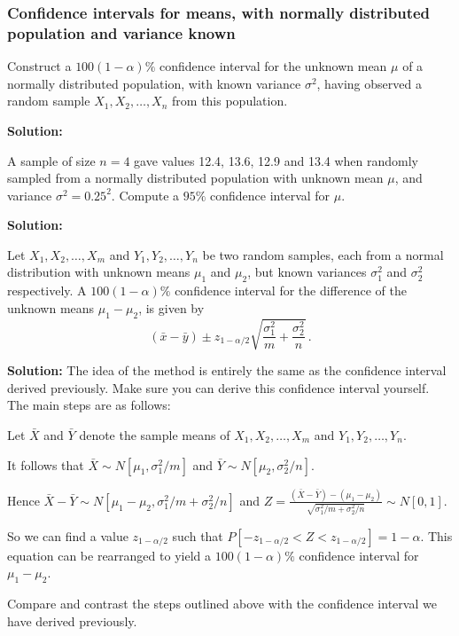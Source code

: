 \documentclass[12pt]{article}
\newenvironment{example}[1][Example:]{\begin{trivlist}
\item[\hskip \labelsep {\bfseries #1}]}{\end{trivlist}}
\begin{document}
\subsubsection{Confidence intervals for means, with normally distributed population and variance known}
\begin{example}
Construct a $100(1-\alpha)\%$ confidence interval for the unknown mean $\mu$ of a normally distributed population, with known variance $\sigma^{2}$, having observed a random sample $X_{1},X_{2},\ldots, X_{n}$ from this population.
\end{example}
\begin{mdframed}
{\bf Solution:}
\textcolor[rgb]{1.00,1.00,1.00}{\lipsum[1-8]}
\end{mdframed}

\begin{example}
A sample of size $n=4$ gave values 12.4, 13.6, 12.9 and 13.4 when randomly sampled from a normally distributed population with unknown mean $\mu$, and variance $\sigma^{2}=0.25^2.$ Compute a $95\%$ confidence interval for $\mu.$
\end{example}

\begin{mdframed}
{\bf Solution:}
\textcolor[rgb]{1.00,1.00,1.00}{\lipsum[1-3]}
\end{mdframed}



\begin{example}
Let $X_{1},X_{2},\ldots, X_{m}$ and $Y_{1},Y_{2},\ldots,Y_{n}$ be two random samples, each from a normal distribution with unknown means $\mu_{1}$ and $\mu_{2}$, but known variances $\sigma_{1}^{2}$ and $\sigma_{2}^{2}$ respectively. A $100(1-\alpha)\%$ confidence interval for the difference of the unknown means $\mu_{1}-\mu_{2}$, is given by $$(\bar{x}-\bar{y})\pm z_{1-\alpha/2}\sqrt{\frac{\sigma_{1}^{2}}{m}+\frac{\sigma_{2}^{2}}{n}}\, .$$
\end{example}
\begin{mdframed}
{\bf Solution:}
The idea of the method is entirely the same as the confidence interval derived previously. Make sure you can derive this confidence interval yourself. The main steps are as follows:

Let $\bar{X}$ and $\bar{Y}$ denote the sample means of $X_{1},X_{2},\ldots, X_{m}$ and $Y_{1},Y_{2},\ldots,Y_{n}$.

It follows that $\bar{X}\sim N\left[\mu_{1},\sigma_{1}^{2}/m\right]$ and $\bar{Y}\sim N\left[\mu_{2},\sigma_{2}^{2}/n\right].$

Hence $\bar{X}-\bar{Y}\sim N\left[\mu_{1}-\mu_{2},\sigma_{1}^{2}/m+\sigma_{2}^{2}/n\right]$ and $ \displaystyle Z=\frac{(\bar{X}-\bar{Y})-(\mu_{1}-\mu_{2})}{\sqrt{\sigma_{1}^{2}/m+\sigma_{2}^{2}/n}}\sim N\left[0,1\right].$

So we can find a value $z_{1-\alpha/2}$ such that $P[-z_{1-\alpha/2}<Z<z_{1-\alpha/2}]=1-\alpha.$ This equation can be rearranged to yield a $100(1-\alpha)\%$ confidence interval for $\mu_{1}-\mu_{2}$.

Compare and contrast the steps outlined above with the confidence interval we have derived previously.
\end{mdframed}
\end{document}
